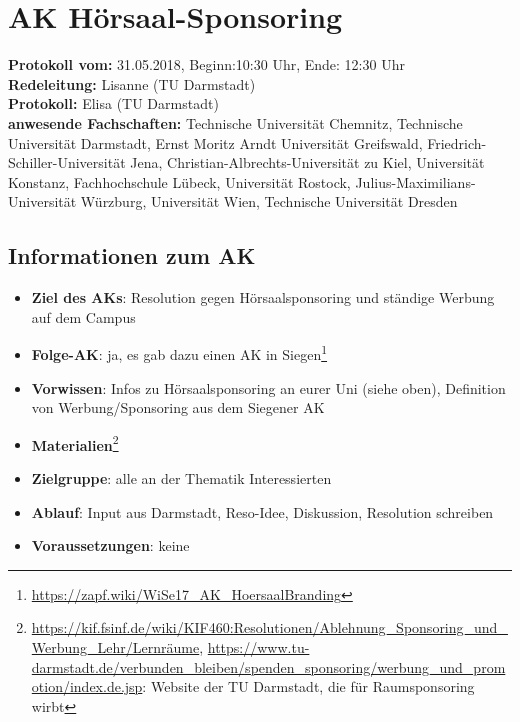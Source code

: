 
\section{AK Hörsaal-Sponsoring}

	\textbf{Protokoll vom:} 31.05.2018,
	Beginn:10:30 Uhr,
	Ende: 12:30 Uhr \\
	\textbf{Redeleitung:} Lisanne (TU Darmstadt) \\
	\textbf{Protokoll:} Elisa (TU Darmstadt) \\
	\textbf{anwesende Fachschaften:} Technische Universität Chemnitz, Technische Universität Darmstadt, Ernst Moritz Arndt Universität Greifswald, Friedrich-Schiller-Universität Jena, Christian-Albrechts-Universität zu Kiel, Universität Konstanz, Fachhochschule Lübeck, Universität Rostock, Julius-Maximilians-Universität Würzburg, Universität Wien, Technische Universität Dresden

	\subsection*{Informationen zum AK}
		\begin{itemize}
			\item \textbf{Ziel des AKs}: Resolution gegen Hörsaalsponsoring und ständige Werbung auf dem Campus
			\item \textbf{Folge-AK}:  ja, es gab dazu einen AK in Siegen\footnote{\url{https://zapf.wiki/WiSe17_AK_HoersaalBranding}}
			\item \textbf{Vorwissen}: Infos zu Hörsaalsponsoring an eurer Uni (siehe oben), Definition von Werbung/Sponsoring aus dem Siegener AK
      \item \textbf{Materialien}\footnote{\url{https://kif.fsinf.de/wiki/KIF460:Resolutionen/Ablehnung_Sponsoring_und_Werbung_Lehr/Lernräume}, \url{https://www.tu-darmstadt.de/verbunden_bleiben/spenden_sponsoring/werbung_und_promotion/index.de.jsp}: Website der TU Darmstadt, die für Raumsponsoring wirbt}
			\item \textbf{Zielgruppe}: alle an der Thematik Interessierten
			\item \textbf{Ablauf}: Input aus Darmstadt, Reso-Idee, Diskussion, Resolution schreiben
			\item \textbf{Voraussetzungen}: keine
		\end{itemize}

